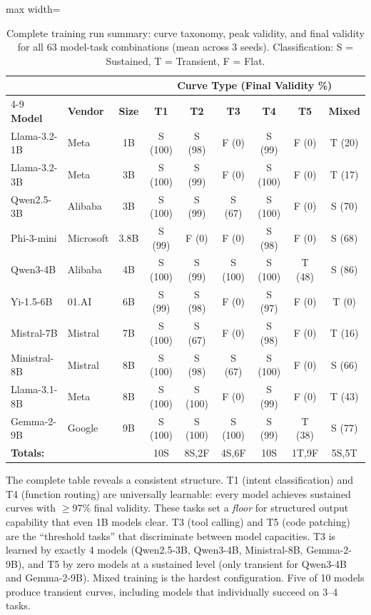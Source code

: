 \documentclass[11pt]{article}
\begin{document}
\begin{table}[h]
\centering
\caption{Complete training run summary: curve taxonomy, peak validity, and final validity for all 63 model-task combinations (mean across 3 seeds).  Classification: S = Sustained, T = Transient, F = Flat.}
\label{tab:all-runs}
\small
\begin{adjustbox}{max width=\textwidth}
\begin{tabular}{llc cccccc}
\toprule
& & & \multicolumn{6}{c}{\textbf{Curve Type (Final Validity \%)}} \\
\cmidrule(lr){4-9}
\textbf{Model} & \textbf{Vendor} & \textbf{Size} & \textbf{T1} & \textbf{T2} & \textbf{T3} & \textbf{T4} & \textbf{T5} & \textbf{Mixed} \\
\midrule
Llama-3.2-1B    & Meta      & 1B   & S (100) & S (98)  & F (0)   & S (99)  & F (0)   & T (20) \\
Llama-3.2-3B    & Meta      & 3B   & S (100) & S (99)  & F (0)   & S (100) & F (0)   & T (17) \\
Qwen2.5-3B      & Alibaba   & 3B   & S (100) & S (99)  & S (67)  & S (100) & F (0)   & S (70) \\
Phi-3-mini       & Microsoft & 3.8B & S (99)  & F (0)   & F (0)   & S (98)  & F (0)   & S (68) \\
Qwen3-4B         & Alibaba   & 4B   & S (100) & S (99)  & S (100) & S (100) & T (48)  & S (86) \\
Yi-1.5-6B        & 01.AI     & 6B   & S (99)  & S (98)  & F (0)   & S (97)  & F (0)   & T (0)  \\
Mistral-7B       & Mistral   & 7B   & S (100) & S (67)  & F (0)   & S (98)  & F (0)   & T (16) \\
Ministral-8B     & Mistral   & 8B   & S (100) & S (98)  & S (67)  & S (100) & F (0)   & S (66) \\
Llama-3.1-8B     & Meta      & 8B   & S (100) & S (100) & F (0)   & S (99)  & F (0)   & T (43) \\
Gemma-2-9B       & Google    & 9B   & S (100) & S (100) & S (100) & S (99)  & T (38)  & S (77) \\
\midrule
\multicolumn{3}{l}{\textbf{Totals:}} & 10S & 8S,2F & 4S,6F & 10S & 1T,9F & 5S,5T \\
\bottomrule
\end{tabular}
\end{adjustbox}
\end{table}

The complete table reveals a consistent structure.  T1 (intent classification) and T4 (function routing) are universally learnable: every model achieves sustained curves with $\geq$97\% final validity.  These tasks set a \emph{floor} for structured output capability that even 1B models clear.  T3 (tool calling) and T5 (code patching) are the ``threshold tasks'' that discriminate between model capacities.  T3 is learned by exactly 4 models (Qwen2.5-3B, Qwen3-4B, Ministral-8B, Gemma-2-9B), and T5 by zero models at a sustained level (only transient for Qwen3-4B and Gemma-2-9B).  Mixed training is the hardest configuration.  Five of 10 models produce transient curves, including models that individually succeed on 3--4 tasks.
\end{document}
